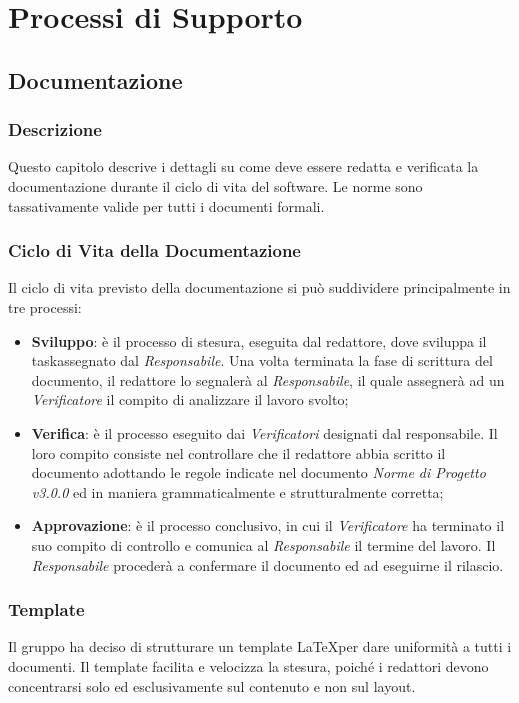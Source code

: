 \section{Processi di Supporto}\label{ProcessiSupporto}

\subsection{Documentazione}\label{ProcessiSupporto_Documentazione}

\subsubsection{Descrizione}
Questo capitolo descrive i dettagli su come deve essere redatta e verificata la documentazione durante il ciclo di vita del software. Le norme sono tassativamente valide per tutti i documenti formali.
\subsubsection{Ciclo di Vita della Documentazione}
Il ciclo di vita previsto della documentazione si può suddividere principalmente in tre processi:
\begin{itemize}
	\item \textbf{Sviluppo}: è il processo di stesura, eseguita dal redattore, dove sviluppa il task\glossario assegnato dal \textit{Responsabile}. Una volta terminata la fase di scrittura del documento, il redattore lo segnalerà al \textit{Responsabile}, il quale assegnerà ad un \textit{Verificatore} il compito di analizzare il lavoro svolto;
 	\item \textbf{Verifica}: è il processo eseguito dai \textit{Verificatori} designati dal responsabile. Il loro compito consiste nel controllare che il redattore abbia scritto il documento adottando le regole indicate nel documento \textit{Norme di Progetto v3.0.0} ed in maniera grammaticalmente e strutturalmente corretta;
 	\item \textbf{Approvazione}: è il processo conclusivo, in cui il \textit{Verificatore} ha terminato il suo compito di controllo e comunica al \textit{Responsabile} il termine del lavoro. Il \textit{Responsabile} procederà a confermare il documento ed ad eseguirne il rilascio.
\end{itemize}

\subsubsection{Template}
Il gruppo ha deciso di strutturare un template \LaTeX  per dare uniformità a tutti i documenti. Il template facilita e velocizza la stesura, poiché i redattori devono concentrarsi solo ed esclusivamente sul contenuto e non sul layout.


